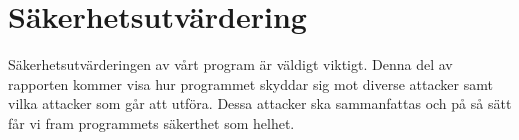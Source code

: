 \section{Säkerhetsutvärdering}
Säkerhetsutvärderingen av vårt program är väldigt viktigt. Denna del av rapporten kommer visa hur programmet skyddar sig mot diverse attacker samt vilka attacker som går att utföra. Dessa attacker ska sammanfattas och på så sätt får vi fram programmets säkerthet som helhet.